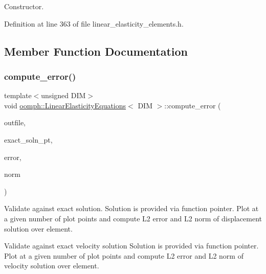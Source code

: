 Constructor. 



Definition at line 363 of file linear\+\_\+elasticity\+\_\+elements.\+h.



\subsection{Member Function Documentation}
\mbox{\label{classoomph_1_1LinearElasticityEquations_a225d149a4b093cd4688fa644c29b75c8}} 
\subsubsection{\texorpdfstring{compute\+\_\+error()}{compute\_error()}\hspace{0.1cm}{\footnotesize\ttfamily [1/2]}}
{\footnotesize\ttfamily template$<$unsigned D\+IM$>$ \\
void \hyperlink{classoomph_1_1LinearElasticityEquations}{oomph\+::\+Linear\+Elasticity\+Equations}$<$ D\+IM $>$\+::compute\+\_\+error (\begin{DoxyParamCaption}\item[{std\+::ostream \&}]{outfile,  }\item[{\hyperlink{classoomph_1_1FiniteElement_a690fd33af26cc3e84f39bba6d5a85202}{Finite\+Element\+::\+Steady\+Exact\+Solution\+Fct\+Pt}}]{exact\+\_\+soln\+\_\+pt,  }\item[{double \&}]{error,  }\item[{double \&}]{norm }\end{DoxyParamCaption})\hspace{0.3cm}{\ttfamily [virtual]}}



Validate against exact solution. Solution is provided via function pointer. Plot at a given number of plot points and compute L2 error and L2 norm of displacement solution over element. 

Validate against exact velocity solution Solution is provided via function pointer. Plot at a given number of plot points and compute L2 error and L2 norm of velocity solution over element. 


